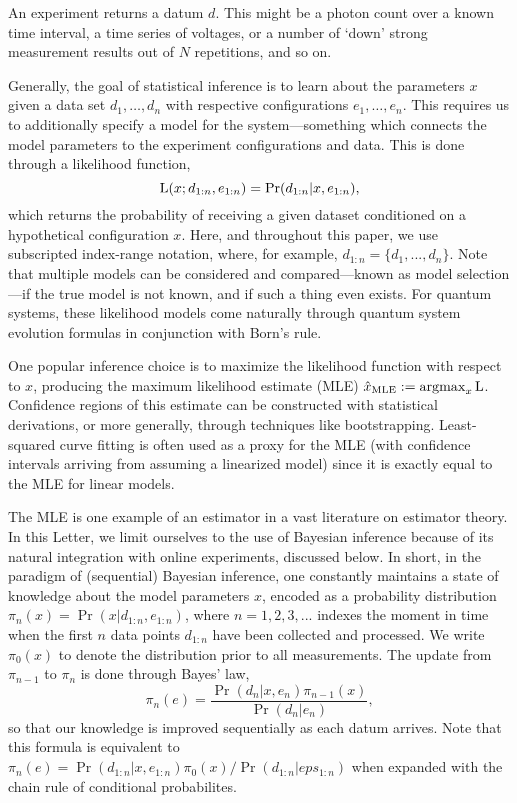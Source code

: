 \documentclass[aps,nofootinbib,twocolumn,superscriptaddress]{revtex4}
\newcommand{\mps}{x}
\newcommand{\eps}{e}
\newcommand{\data}{d}
\newcommand{\MLE}{\text{MLE}}
\begin{document}
An experiment returns a datum $\data$. 
This might be a photon count
over a known time interval, a time series of voltages, 
or a number of `down' strong measurement results out of $N$ 
repetitions, and so on.

Generally, the goal of statistical inference is to learn about the parameters
$\mps$ given a data set $\data_1,\ldots,\data_n$ with respective 
configurations $\eps_1,\ldots,\eps_n$.
This requires us to additionally specify a model for the 
system---something which connects the model parameters to the experiment 
configurations and data.
This is done through a likelihood function,
\begin{equation}
    \Lhood(\mps;\data_{1:n},\eps_{1:n})
        = \Pr(\data_{1:n}|\mps,\eps_{1:n}),
    \label{eq:general-likelihood-function}
\end{equation} 
which returns the probability of receiving a given dataset conditioned
on a hypothetical configuration $\mps$.
Here, and throughout this paper, we use subscripted index-range notation,
where, for example, $\data_{1:n}=\{\data_1,...,\data_n\}$.
Note that multiple models can be considered and compared---known
as model selection---if the
true model is not known, and if such a thing even exists.
For quantum systems, these likelihood models come naturally
through quantum system evolution formulas in conjunction 
with Born's rule.

One popular inference choice is to maximize the likelihood function
with respect to $\mps$, producing the maximum likelihood estimate (MLE) 
$\hat{\mps}_\MLE:=\operatorname{argmax}_\mps \Lhood$.
Confidence regions of this estimate can be constructed 
with statistical derivations, or more generally, through techniques like bootstrapping.
Least-squared curve fitting is often used as a proxy for the MLE (with 
confidence intervals arriving from assuming
a linearized model) since it is exactly equal to the MLE
for linear models.

The MLE is one example of an estimator in a vast literature on estimator theory.
In this Letter, we limit ourselves to the use of Bayesian inference because of its
natural integration with online experiments, discussed below.
In short, in the paradigm of (sequential) Bayesian inference, one constantly
maintains a state of knowledge about the model parameters $\mps$, encoded
as a probability distribution $\pi_n(\mps)=\Pr(\mps|\data_{1:n},\eps_{1:n})$, 
where $n=1,2,3,...$ indexes the moment in time when the first $n$ data 
points $\data_{1:n}$ have been collected and processed.
We write $\pi_0(x)$ to denote the distribution prior to all measurements.
The update from $\pi_{n-1}$ to $\pi_n$ is done through Bayes' law,
\begin{equation}
    \pi_n(\eps)
        = \frac{
            \Pr(\data_n|\mps,\eps_n)\pi_{n-1}(\mps)
        }{
            \Pr(\data_n|\eps_n)
        },
\end{equation}
so that our knowledge is improved sequentially as each datum arrives.
Note that this formula is equivalent to 
$\pi_n(\eps)=\Pr(\data_{1:n}|\mps,\eps_{1:n})\pi_0(\mps)/\Pr(\data_{1:n}|eps_{1:n})$ when expanded with the chain rule of conditional probabilites.
\end{document}
